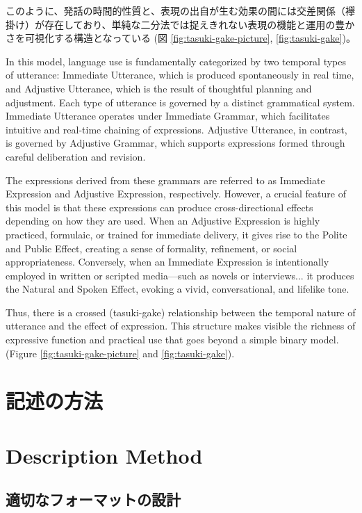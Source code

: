 \documentclass[a4paper,xelatex,ja=standard]{bxjsarticle}
\begin{document}
このように、発話の時間的性質と、表現の出自が生む効果の間には交差関係（襷掛け）が存在しており、単純な二分法では捉えきれない表現の機能と運用の豊かさを可視化する構造となっている
(図 \ref{fig:tasuki-gake-picture}, \ref{fig:tasuki-gake})。

\else

In this model, language use is fundamentally categorized by two temporal types of utterance:
Immediate Utterance, which is produced spontaneously in real time, and
Adjustive Utterance, which is the result of thoughtful planning and adjustment.
Each type of utterance is governed by a distinct grammatical system.
Immediate Utterance operates under Immediate Grammar, which facilitates intuitive and real-time chaining of expressions.
Adjustive Utterance, in contrast, is governed by Adjustive Grammar, which supports expressions formed through careful deliberation and revision.

The expressions derived from these grammars are referred to as
Immediate Expression and Adjustive Expression, respectively.
However, a crucial feature of this model is that these expressions can produce cross-directional effects depending on how they are used.
When an Adjustive Expression is highly practiced, formulaic, or trained for immediate delivery,
it gives rise to the Polite and Public Effect, creating a sense of formality, refinement, or social appropriateness.
Conversely, when an Immediate Expression is intentionally employed in written or scripted media—such as novels or interviews...
    it produces the Natural and Spoken Effect, evoking a vivid, conversational, and lifelike tone.

Thus, there is a crossed (tasuki-gake) relationship between the temporal nature of utterance and the effect of expression.
This structure makes visible the richness of expressive function and practical use that goes beyond a simple binary model.(Figure \ref{fig:tasuki-gake-picture} and \ref{fig:tasuki-gake}).
\fi


\ifJPN
\section{記述の方法}
\else
\section{Description Method}
\fi

\ifJPN
\subsection{適切なフォーマットの設計}
\else
\end{document}
